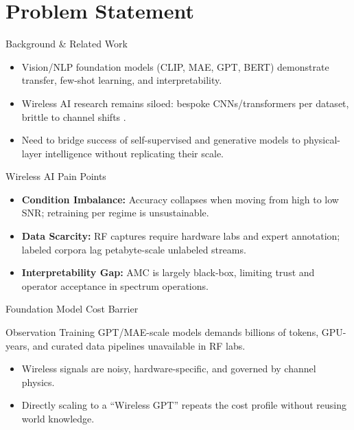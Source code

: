 \section{Problem Statement}

\begin{frame}{Background \& Related Work}
    \begin{itemize}
        \item Vision/NLP foundation models (CLIP, MAE, GPT, BERT) demonstrate transfer, few-shot learning, and interpretability.
        \item Wireless AI research remains siloed: bespoke CNNs/transformers per dataset, brittle to channel shifts \cite{kong2023transformer, gao2023moe}.
        \item Need to bridge success of self-supervised and generative models to physical-layer intelligence without replicating their scale.
    \end{itemize}
\end{frame}

\begin{frame}{Wireless AI Pain Points}
    \begin{itemize}
        \item \textbf{Condition Imbalance:} Accuracy collapses when moving from high to low SNR; retraining per regime is unsustainable.
        \item \textbf{Data Scarcity:} RF captures require hardware labs and expert annotation; labeled corpora lag petabyte-scale unlabeled streams.
        \item \textbf{Interpretability Gap:} AMC is largely black-box, limiting trust and operator acceptance in spectrum operations.
    \end{itemize}
\end{frame}

\begin{frame}{Foundation Model Cost Barrier}
    \begin{block}{Observation}
        Training GPT/MAE-scale models demands billions of tokens, GPU-years, and curated data pipelines unavailable in RF labs.
    \end{block}
    \begin{itemize}
        \item Wireless signals are noisy, hardware-specific, and governed by channel physics.
        \item Directly scaling to a ``Wireless GPT'' repeats the cost profile without reusing world knowledge.
    \end{itemize}
\end{frame}

